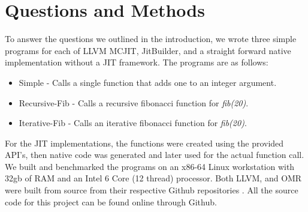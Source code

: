 \section{Questions and Methods}
\label{sec:methodology}
To answer the questions we outlined in the introduction, we wrote three simple programs for each of LLVM MCJIT, JitBuilder, and a straight forward native implementation without a JIT framework.
The programs are as follows:
\begin{itemize}
    \item Simple - Calls a single function that adds one to an integer argument.
    \item Recursive-Fib - Calls a recursive fibonacci function for \textit{fib(20)}.
    \item Iterative-Fib - Calls an iterative fibonacci function for \textit{fib(20)}.  
\end{itemize}
For the JIT implementations, the functions were created using the provided API's, then native code was generated and later used for the actual function call.
We built and benchmarked the programs on an x86-64 Linux workstation with 32gb of RAM and an Intel 6 Core (12 thread) processor. 
Both LLVM, and OMR were built from source from their respective Github repositories \cite{llvmCommit, omrCommit}.
All the source code for this project can be found online through Github\cite{projectGithub}.

